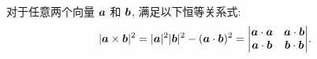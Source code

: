 \begin{theorem}
    对于任意两个向量 $\vb*{a}$ 和 $\vb*{b}$, 满足以下恒等关系式:
    $$|\vb*{a} \times \vb*{b}|^{2}=|\vb*{a}|^{2}|\vb*{b}|^{2}-(\vb*{a} \cdot \vb*{b})^{2}
        =\mqty|\vb*{a} \cdot \vb*{a} & \vb*{a} \cdot \vb*{b} \\
        \vb*{a} \cdot \vb*{b} & \vb*{b} \cdot \vb*{b}|.$$
\end{theorem}

% 
% 
% 
% 
% 
